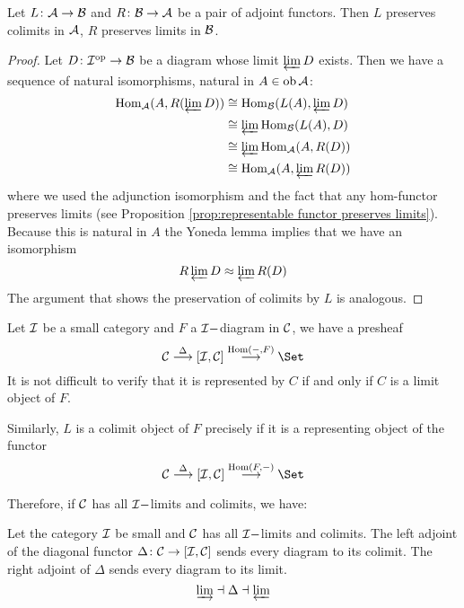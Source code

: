   \begin{prop}\label{prop:adjoint functor preserves limits}
    Let $L\colon{\cal A}\to{\cal B}$ and $R\colon{\cal B}\to{\cal A}$ be a pair of adjoint functors. Then $L$ preserves colimits in ${\cal A}$, $R$ preserves limits in ${\cal B}$.
  \end{prop}
  \begin{proof}
    Let $D\colon{\cal I}^{\operatorname{op}}\to{\cal B}$ be a diagram whose limit $\operatorname*{\underleftarrow{\lim}} D$ exists. Then we have a sequence of natural isomorphisms, natural in $A\in\operatorname{ob}{\cal A}$:
    \begin{align*}
      \operatorname{Hom}_{{\cal A}}(A,R(\operatorname*{\underleftarrow{\lim}} D)) & \cong \operatorname{Hom}_{{\cal B}}(L(A),\operatorname*{\underleftarrow{\lim}} D)  \\
       & \cong \operatorname*{\underleftarrow{\lim}}\operatorname{Hom}_{{\cal B}}(L(A),D) \\
       & \cong \operatorname*{\underleftarrow{\lim}}\operatorname{Hom}_{{\cal A}}(A,R(D)) \\
       & \cong \operatorname{Hom}_{{\cal A}}(A,\operatorname*{\underleftarrow{\lim}} R(D))
    \end{align*}
    where we used the adjunction isomorphism and the fact that any hom-functor preserves limits (see Proposition \ref{prop:representable functor preserves limits}). Because this is natural in $A$ the Yoneda lemma implies that we have an isomorphism
    \begin{equation*}
      R\operatorname*{\underleftarrow{\lim}} D\approx\operatorname*{\underleftarrow{\lim}} R(D)
    \end{equation*}
    The argument that shows the preservation of colimits by $L$ is analogous.
  \end{proof}

Let ${\cal I}$ be a small category and $F$ a ${\cal I}-$diagram in ${\cal C}$, we have a presheaf
\begin{equation*}
  \Cc\markar{\Delta}[\Ii,\Cc]\markar{\Hom(-,F)}\Set
\end{equation*}
It is not difficult to verify that it is represented by $C$ if and only if $C$ is a limit object of $F$.

Similarly, $L$ is a colimit object of $F$ precisely if it is a representing object of the functor
\begin{equation*}
  \Cc\markar{\Delta}[\Ii,\Cc]\markar{\Hom(F,-)}\Set
\end{equation*}

Therefore, if ${\cal C}$ has all ${\cal I}-$limits and colimits, we have:
\begin{prop}\label{prop:limits as adjoint functors}
  Let the category ${\cal I}$ be small and ${\cal C}$ has all ${\cal I}-$limits and colimits. The left adjoint of the diagonal functor $\Delta\colon{\cal C}\to[{\cal I},{\cal C}]$ sends every diagram to its colimit. The right adjoint of $\Delta$ sends every diagram to its limit.
  \begin{equation*}
    \operatorname*{\underrightarrow{\lim}}\dashv\Delta\dashv\operatorname*{\underleftarrow{\lim}}
  \end{equation*}
\end{prop}

